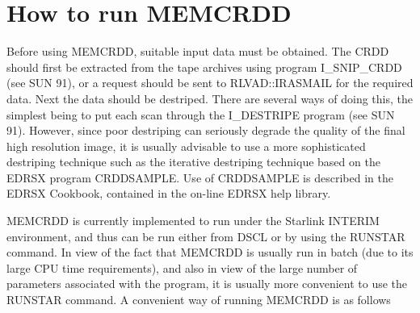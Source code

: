 \section {How to run MEMCRDD}
\label {SEC:RUN}
Before using MEMCRDD, suitable input data must be obtained. The 
CRDD should
first be extracted from the tape archives using program I\_SNIP\_CRDD (see SUN
91), or a request should be sent to RLVAD::IRASMAIL for the required 
data.
Next the data should be destriped. There are several ways of doing this, the
simplest being to put each scan through the I\_DESTRIPE program (see SUN 91). 
However, since poor destriping can seriously degrade the quality of the final 
high resolution image, it is usually advisable to use a more sophisticated 
destriping technique such as the iterative destriping technique based on the
EDRSX program CRDDSAMPLE. Use of CRDDSAMPLE is described in the EDRSX Cookbook,
contained in the on-line EDRSX help library.

MEMCRDD is currently implemented to run under the Starlink INTERIM environment,
and thus can be run either from DSCL or by using the RUNSTAR command. In view
of the fact that MEMCRDD is usually run in batch (due to its large CPU time 
requirements), and also in view of the large number of parameters associated 
with the program, it is usually more convenient to use the RUNSTAR command. A
convenient way of running MEMCRDD is as follows

